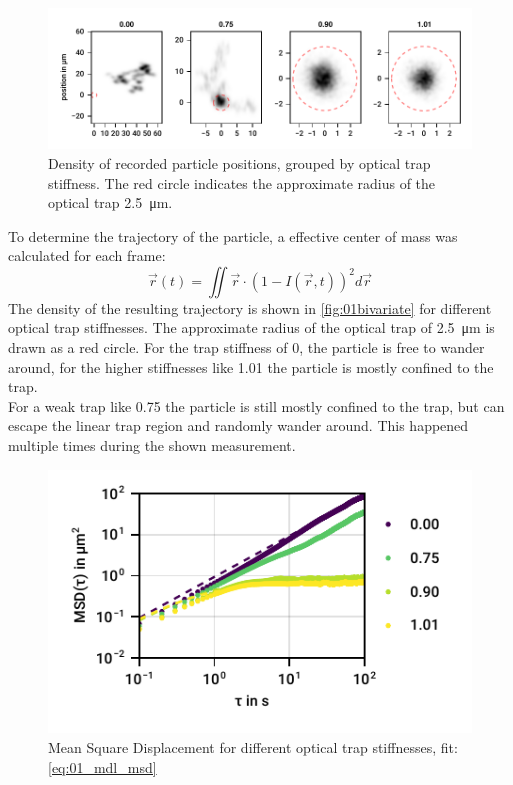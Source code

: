 \documentclass[
    parskip=half, 
    twoside=false,
    twocolumn=true,
    fontsize=11pt,
]{scrarticle}
\begin{document}
\begin{figure}
    \centering
    \includegraphics{figures/01_03_1_bivariate.pdf}
    \caption{Density of recorded particle positions, grouped by optical trap stiffness. The red circle indicates the approximate radius of the optical trap \SI{2.5}{\micro m}.}
    \label{fig:01bivariate}
\end{figure}
To determine the trajectory of the particle, a effective center of mass was calculated for each frame:
\begin{equation}
    \vec{r}(t) = \iint \vec{r} \cdot \left(1-I(\vec{r}, t)\right)^2 d\vec{r}    
\end{equation}
The density of the resulting trajectory is shown in \autoref{fig:01bivariate} for different optical trap stiffnesses.
The approximate radius of the optical trap of \SI{2.5}{\micro m} is drawn as a red circle.
For the trap stiffness of \SI{0}{}, the particle is free to wander around, for the higher stiffnesses like \SI{1.01}{} the particle is mostly confined to the trap.\\
For a weak trap like \SI{0.75}{} the particle is still mostly confined to the trap, but can escape the linear trap region and randomly wander around. 
This happened multiple times during the shown measurement.

\begin{figure}
    \centering
    \includegraphics{figures/01_02_2_msd.pdf}
    \caption{Mean Square Displacement for different optical trap stiffnesses, fit: \autoref{eq:01_mdl_msd}}
    \label{fig:01msd}
\end{figure}
\end{document}
